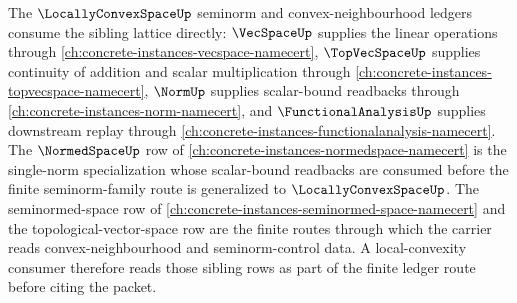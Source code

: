 The $\LocallyConvexSpaceUp$ seminorm and convex-neighbourhood ledgers consume the sibling lattice directly: $\VecSpaceUp$ supplies the linear operations through \autoref{ch:concrete-instances-vecspace-namecert}, $\TopVecSpaceUp$ supplies continuity of addition and scalar multiplication through \autoref{ch:concrete-instances-topvecspace-namecert}, $\NormUp$ supplies scalar-bound readbacks through \autoref{ch:concrete-instances-norm-namecert}, and $\FunctionalAnalysisUp$ supplies downstream replay through \autoref{ch:concrete-instances-functionalanalysis-namecert}. The $\NormedSpaceUp$ row of \autoref{ch:concrete-instances-normedspace-namecert} is the single-norm specialization whose scalar-bound readbacks are consumed before the finite seminorm-family route is generalized to $\LocallyConvexSpaceUp$. The seminormed-space row of \autoref{ch:concrete-instances-seminormed-space-namecert} and the topological-vector-space row are the finite routes through which the carrier reads convex-neighbourhood and seminorm-control data. A local-convexity consumer therefore reads those sibling rows as part of the finite ledger route before citing the packet.
